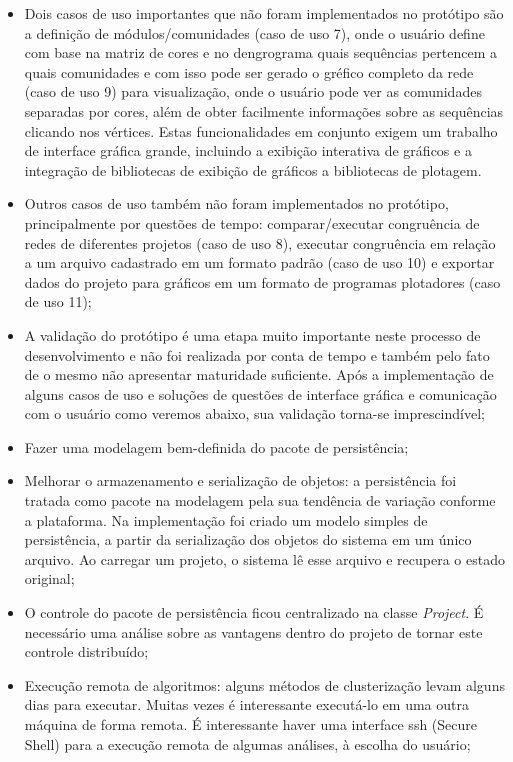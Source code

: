 \begin{itemize}
  \item{Dois casos de uso importantes que não foram implementados no protótipo são a definição de módulos/comunidades (caso de uso 7), onde o usuário define
com base na matriz de cores e no dengrograma quais sequências pertencem a quais comunidades e com isso pode ser gerado o gréfico completo da rede (caso de
uso 9) para visualização, onde o usuário pode ver as comunidades separadas por cores, além de obter facilmente informações sobre as sequências clicando nos
vértices. Estas funcionalidades em conjunto
exigem um trabalho de interface gráfica grande, incluindo a exibição interativa de gráficos e a integração de bibliotecas de exibição de
gráficos a bibliotecas de plotagem.}
  \item{Outros casos de uso também não foram implementados no protótipo, principalmente por questões de tempo: comparar/executar congruência de redes de
diferentes projetos (caso de uso 8), executar congruência em relação a um arquivo cadastrado em um
formato padrão (caso de uso 10) e exportar dados do projeto para gráficos em um formato de programas plotadores (caso de uso 11);}
  \item{A validação do protótipo é uma etapa muito importante neste processo de desenvolvimento e não foi realizada por conta de tempo e também pelo fato
de o mesmo não apresentar maturidade suficiente. Após a implementação de alguns casos de uso e soluções de questões de interface gráfica e comunicação com
o usuário como veremos abaixo, sua validação torna-se imprescindível;}
  \item{Fazer uma modelagem bem-definida do pacote de persistência;}
  \item{Melhorar o armazenamento e serialização de objetos: a persistência foi tratada como pacote na modelagem pela sua tendência de variação conforme
a plataforma. Na implementação foi criado um modelo simples de persistência, a partir da serialização dos objetos do sistema em um único arquivo. Ao
carregar um projeto, o sistema lê esse arquivo e recupera o estado original;}
  \item{O controle do pacote de persistência ficou centralizado na classe \textit{Project}. É necessário uma análise sobre as vantagens dentro
do projeto de tornar este controle distribuído;}
  \item{Execução remota de algoritmos: alguns métodos de clusterização levam alguns dias para executar. Muitas vezes é interessante executá-lo em uma outra
máquina de forma remota. É interessante haver uma interface ssh (Secure Shell) para a execução remota de algumas análises, à escolha do usuário;}

\end{itemize}
